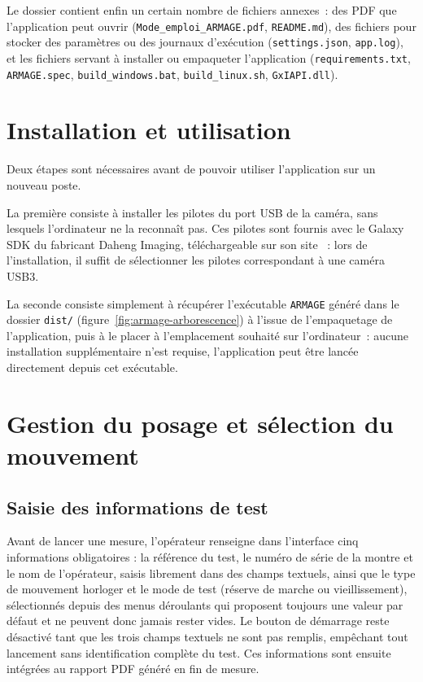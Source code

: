 Le dossier contient enfin un certain nombre de fichiers annexes~: des PDF
que l'application peut ouvrir (\texttt{Mode\_emploi\_ARMAGE.pdf},
\texttt{README.md}), des fichiers pour stocker des paramètres ou des
journaux d'exécution (\texttt{settings.json}, \texttt{app.log}), et les
fichiers servant à installer ou empaqueter l'application
(\texttt{requirements.txt}, \texttt{ARMAGE.spec},
\texttt{build\_windows.bat}, \texttt{build\_linux.sh}, \texttt{GxIAPI.dll}).

\section{Installation et utilisation}

Deux étapes sont nécessaires avant de pouvoir utiliser l'application sur un
nouveau poste.

La première consiste à installer les pilotes du port USB de la caméra, sans
lesquels l'ordinateur ne la reconnaît pas. Ces pilotes sont fournis avec le
Galaxy SDK du fabricant Daheng Imaging, téléchargeable sur son site
\cite{daheng_galaxy_sdk}~: lors de l'installation, il suffit de sélectionner
les pilotes correspondant à une caméra USB3.

La seconde consiste simplement à récupérer l'exécutable \texttt{ARMAGE}
généré dans le dossier \texttt{dist/} (figure~\ref{fig:armage-arborescence})
à l'issue de l'empaquetage de l'application, puis à le placer à
l'emplacement souhaité sur l'ordinateur~: aucune installation supplémentaire
n'est requise, l'application peut être lancée directement depuis cet
exécutable.


\section{Gestion du posage et sélection du mouvement}

\subsection{Saisie des informations de test}

Avant de lancer une mesure, l'opérateur renseigne dans l'interface cinq
informations obligatoires : la référence du test, le numéro de série de la
montre et le nom de l'opérateur, saisis librement dans des champs textuels,
ainsi que le type de mouvement horloger et le mode de test (réserve de
marche ou vieillissement), sélectionnés depuis des menus déroulants qui
proposent toujours une valeur par défaut et ne peuvent donc jamais rester
vides. Le bouton de démarrage reste désactivé tant que les trois champs
textuels ne sont pas remplis, empêchant tout lancement sans identification
complète du test. Ces informations sont ensuite intégrées au rapport PDF
généré en fin de mesure.


